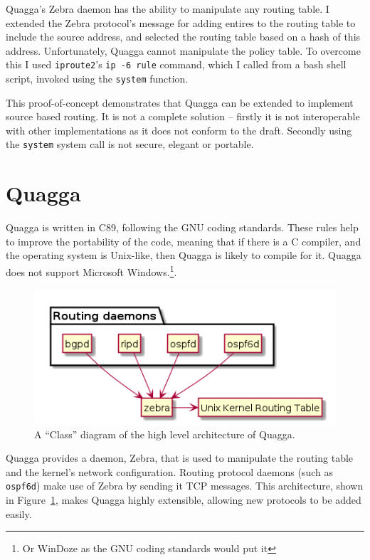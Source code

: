 Quagga's Zebra daemon has the ability to manipulate any routing table. I
extended the Zebra protocol's message for adding entires to the routing table
to include the source address, and selected the routing table based on a hash
of this address. Unfortunately, Quagga cannot manipulate the policy table. To
overcome this I used \texttt{iproute2}'s \texttt{ip -6 rule} command, which I
called from a bash shell script, invoked using the \texttt{system} function. 

This proof-of-concept demonstrates that Quagga can be extended to implement
source based routing. It is not a complete solution -- firstly it is not
interoperable with other implementations as it does not conform to the draft.
Secondly using the \texttt{system} system call is not secure, elegant or
portable. 

\section{Quagga}
Quagga is written in C89, following the GNU coding
standards\cite{gnucodestandards}. These rules help to improve the portability
of the code, meaning that if there is a C compiler, and the operating system is
Unix-like, then Quagga is likely to compile for it.  Quagga does not
support Microsoft Windows.\footnote{Or WinDoze as the GNU coding standards would
put it}.

\begin{figure}
\begin{center}
	\includegraphics[width=0.8\linewidth]{../Diagrams/UML/quaggaZebra/quaggaZebra.png}
	\caption{A ``Class'' diagram of the high level architecture of Quagga.}\label{fig:zebra}
\end{center}
\end{figure}
Quagga provides a daemon, Zebra, that is used to manipulate the routing table
and the kernel's network configuration. Routing protocol daemons (such as
\texttt{ospf6d}) make use of Zebra by sending it
TCP messages. This
architecture, shown in Figure~\ref{fig:zebra}, makes Quagga highly extensible,
allowing new protocols to be added easily.

